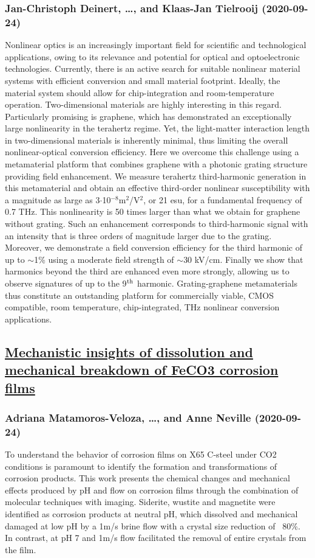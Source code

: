 \subsubsection*{Jan-Christoph Deinert, \dots, and Klaas-Jan Tielrooij (2020-09-24)}
Nonlinear optics is an increasingly important field for scientific and
technological applications, owing to its relevance and potential for optical
and optoelectronic technologies. Currently, there is an active search for
suitable nonlinear material systems with efficient conversion and small
material footprint. Ideally, the material system should allow for
chip-integration and room-temperature operation. Two-dimensional materials are
highly interesting in this regard. Particularly promising is graphene, which
has demonstrated an exceptionally large nonlinearity in the terahertz regime.
Yet, the light-matter interaction length in two-dimensional materials is
inherently minimal, thus limiting the overall nonlinear-optical conversion
efficiency. Here we overcome this challenge using a metamaterial platform that
combines graphene with a photonic grating structure providing field
enhancement. We measure terahertz third-harmonic generation in this
metamaterial and obtain an effective third-order nonlinear susceptibility with
a magnitude as large as 3$\cdot$10$^{-8}$m$^2$/V$^2$, or 21 esu, for a
fundamental frequency of 0.7 THz. This nonlinearity is 50 times larger than
what we obtain for graphene without grating. Such an enhancement corresponds to
third-harmonic signal with an intensity that is three orders of magnitude
larger due to the grating. Moreover, we demonstrate a field conversion
efficiency for the third harmonic of up to $\sim$1\% using a moderate field
strength of $\sim$30 kV/cm. Finally we show that harmonics beyond the third are
enhanced even more strongly, allowing us to observe signatures of up to the
9$^{\rm th}$ harmonic. Grating-graphene metamaterials thus constitute an
outstanding platform for commercially viable, CMOS compatible, room
temperature, chip-integrated, THz nonlinear conversion applications.

\subsection*{\href{http://arxiv.org/abs/2009.11711v1}{Mechanistic insights of dissolution and mechanical breakdown of FeCO3  corrosion films}}
\subsubsection*{Adriana Matamoros-Veloza, \dots, and Anne Neville (2020-09-24)}
To understand the behavior of corrosion films on X65 C-steel under CO2
conditions is paramount to identify the formation and transformations of
corrosion products. This work presents the chemical changes and mechanical
effects produced by pH and flow on corrosion films through the combination of
molecular techniques with imaging. Siderite, wustite and magnetite were
identified as corrosion products at neutral pH, which dissolved and mechanical
damaged at low pH by a 1m/s brine flow with a crystal size reduction of ~80\%.
In contrast, at pH 7 and 1m/s flow facilitated the removal of entire crystals
from the film.

